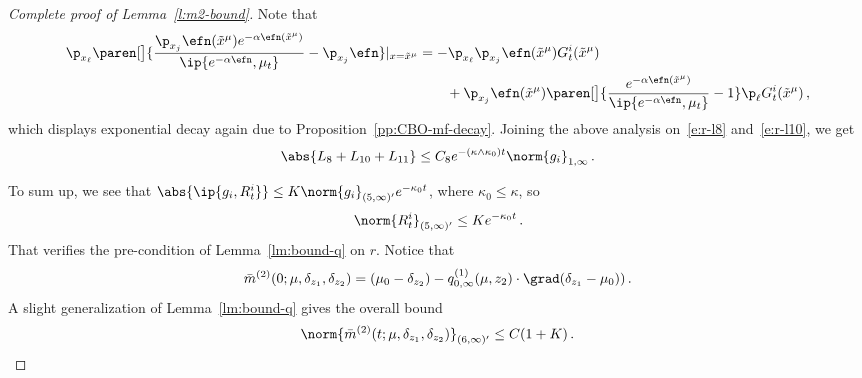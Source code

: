 \documentclass{amsart}
\begin{document}
\begin{proof}[Complete proof of Lemma~\ref{l:m2-bound}]
    Note that 
    \begin{align*}
        \p_{x_\ell} \paren[\big]{ \frac{\p_{x_j} \efn(\tilde x^\mu) e^{-\alpha \efn(\tilde x^\mu)}}{\ip{e^{-\alpha\efn}, \mu_t}} - \p_{x_j} \efn} \vert_{x=\tilde x^\mu} & = - \p_{x_\ell} \p_{x_j} \efn(\tilde x^\mu) G_t^i(\tilde x^\mu) \\
        & \qquad + \p_{x_j} \efn(\tilde x^\mu) \paren[\big]{ \frac{e^{-\alpha\efn(\tilde x^\mu)}}{\ip{e^{-\alpha\efn}, \mu_t}} - 1 } \p_{\ell} G_t^i (\tilde x^\mu) \,,
    \end{align*}
    which displays exponential decay again due to Proposition~\ref{pp:CBO-mf-decay}.
    Joining the above analysis on~\eqref{e:r-l8} and~\eqref{e:r-l10}, we get 
    \begin{equation*}
        \abs{L_8 + L_{10} + L_{11}} \le C_8 e^{-(\kappa \land \kappa_0) t} \norm{g_i}_{1,\infty} \,.
    \end{equation*}

	To sum up, we see that $\abs{\ip{g_i, R^i_t}} \le K \norm{g_i}_{(5,\infty)'} e^{-\kappa_0 t}$, where $\kappa_0 \le \kappa$, so 
	\begin{equation*}
		\norm{R^i_t}_{(5,\infty)'} \le K e^{-\kappa_0 t} \,.
	\end{equation*}
	That verifies the pre-condition of Lemma~\ref{lm:bound-q} on $r$. 
	Notice that 
	\begin{equation*}
		\bar m^{(2)}(0;\mu,\delta_{z_1},\delta_{z_2}) = (\mu_0 - \delta_{z_2}) - q^{(1)}_{0,\infty}(\mu,z_2) \cdot \grad (\delta_{z_1} - \mu_0)) \,.
	\end{equation*}
	A slight generalization of Lemma~\ref{lm:bound-q} gives the overall bound 
	\begin{equation*}
		\norm{\bar m^{(2)}(t;\mu,\delta_{z_1},\delta_{z_2})}_{(6,\infty)'} \le C(1+K) \,.
	\end{equation*}
\end{proof}
\end{document}
